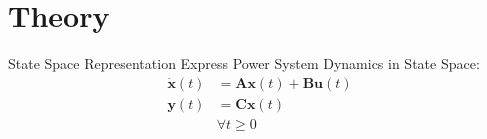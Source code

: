 \section[Theory]{Theory}
\label{sec:lasso_theory}

\begin{frame}[fragile]{State Space Representation}
	Express Power System Dynamics in State Space:
	\begin{equation}
		\label{eq:ssr}
		\begin{align}
			\dot{\textbf{x}}(t) &= 
			 \textbf{A}\textbf{x}(t)
			+ \textbf{B}\textbf{u}(t)\\
			\textbf{y}(t) &= 
			 \textbf{C}\textbf{x}(t)\\  
			& \forall t\geq0	
		\end{align}
	\end{equation}

\end{frame}